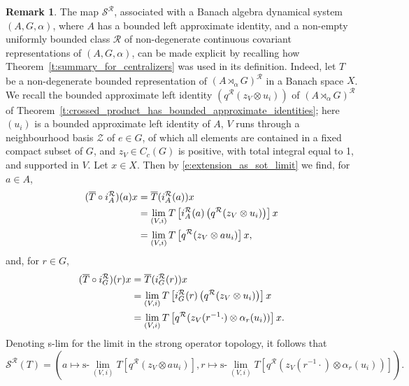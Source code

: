 \documentclass{amsart}
\theoremstyle{plain}
\theoremstyle{definition}
\newtheorem{remark}[theorem]{Remark}
\numberwithin{equation}{section}
\begin{document}
\begin{remark}\label{r:s_lim}
 The map ${{\mathcal S}^{\mathcal R}}$, associated with a Banach algebra dynamical system ${(A,G,\alpha)}$, where $A$ has a bounded left approximate identity, and a non-empty uniformly bounded class ${\mathcal R}$ of non-degenerate continuous covariant representations of ${(A,G,\alpha)}$, can be made explicit by recalling how Theorem~\ref{t:summary_for_centralizers} was used in its definition. Indeed, let $T$ be a non-degenerate bounded representation of ${(A {\rtimes}_\alpha G)^\mathcal{R}}$ in a Banach space $X$. We recall the bounded approximate left identity $({q^{\mathcal R}}(z_V \otimes u_i))$ of ${(A {\rtimes}_\alpha G)^\mathcal{R}}$ of Theorem~\ref{t:crossed_product_has_bounded_approximate_identities}; here $(u_i)$ is a bounded approximate left identity of $A$, $V$ runs through a neighbourhood basis $\mathcal Z$ of $e\in G$, of which all elements are contained in a fixed compact subset of $G$, and $z_V\in C_c(G)$ is positive, with total integral equal to 1, and supported in $V$. Let $x\in X$. Then by \eqref{e:extension_as_sot_limit} we find, for $a\in A$,
\begin{align}\label{e:S_explicit_A}
 (\overline{T} \circ i_A^{\mathcal R})(a)x &= \overline{T}(i_A^{\mathcal R}(a))x \\
&= \lim_{(V,i)} T \left[ i_A^{\mathcal R}(a)\left( {q^{\mathcal R}}(z_V \otimes u_i)\right) \right] x\notag \\
&= \lim_{(V,i)} T \left[ {q^{\mathcal R}}(z_V \otimes a u_i) \right] x,\notag
\end{align}
and, for $r \in G$,
\begin{align}\label{e:S_explicit_G}
 (\overline{T} \circ i_G^{\mathcal R})(r)x &= \overline{T}(i_G^{\mathcal R}(r))x \\
&= \lim_{(V,i)} T \left[ i_G^{\mathcal R}(r) \left({q^{\mathcal R}}(z_V \otimes u_i)\right) \right] x\notag \\
&= \lim_{(V,i)} T \left[ {q^{\mathcal R}}(z_V(r^{-1} \cdot) \otimes \alpha_r(u_i)) \right] x.\notag
\end{align}
Denoting s-lim for the limit in the strong operator topology, it follows that
\[ {{\mathcal S}^{\mathcal R}}(T) = \left( a \mapsto \mbox{s-}\lim_{(V,i)} T \left[ {q^{\mathcal R}}(z_V \otimes a u_i) \right], r \mapsto \mbox{s-}\lim_{(V,i)} T \left [{q^{\mathcal R}}(z_V(r^{-1} \cdot) \otimes \alpha_r( u_i)) \right] \right). \]
\end{remark}
\end{document}
